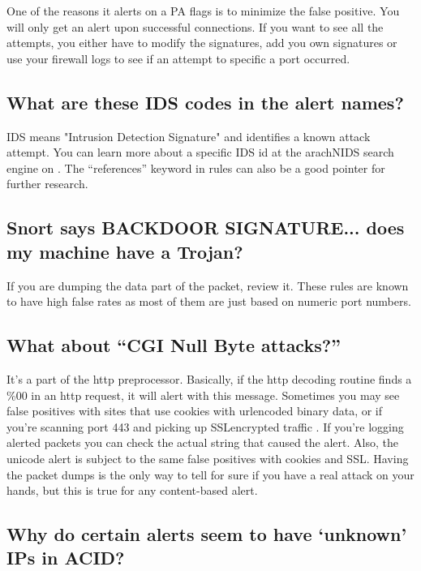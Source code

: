 \documentclass{article}
\begin{document}
One of the reasons it alerts on a PA flags is to minimize the false
positive. You will only get an alert upon successful connections. If you
want to see all the attempts, you either have to modify the signatures, add
you own signatures or use your firewall logs to see if an attempt to
specific a port occurred.


\subsection{What are these IDS codes in the alert names? }

IDS means "Intrusion Detection Signature" and identifies a
known attack attempt. You can learn more about a specific IDS id
at the arachNIDS search engine on 
.
The ``references'' keyword in rules can also be a good pointer 
for further research.


\subsection{Snort says BACKDOOR SIGNATURE... does my machine have a Trojan? }

If you are dumping the data part of the packet, review it.
These rules are known to have high false rates as most of them
are just based on numeric port numbers.


\subsection{What about ``CGI Null Byte attacks?'' }

It's a part of the http preprocessor. Basically, if the http decoding 
routine finds a \%00 in an http request, it will alert with this message. 
Sometimes you may see false positives with sites that use cookies with
urlencoded binary data, or if you're scanning port 443 and picking up 
SSLencrypted  traffic . If you're logging alerted packets you can  check
the  actual string that caused the alert.  Also, the unicode alert is
subject to  the same false positives with cookies and SSL. Having the packet
dumps is the  only way to tell for sure if you have a real attack on your
hands, but this  is true for any content-based alert.

\subsection{Why do certain alerts seem to have `unknown' IPs in ACID?  }
\end{document}
